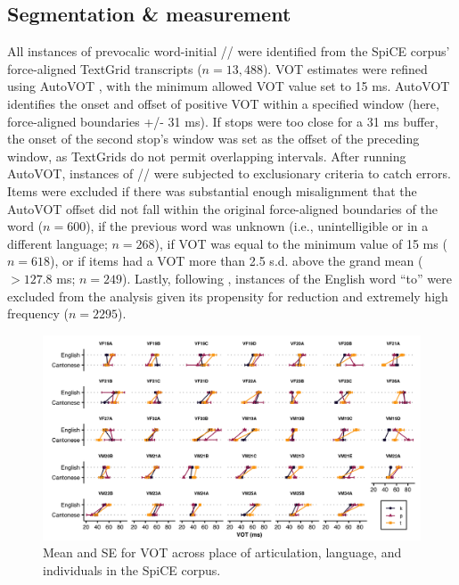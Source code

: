 \subsection{Segmentation \& measurement}
All instances of prevocalic word-initial // were identified from the SpiCE corpus' force-aligned TextGrid transcripts ($n=13,488$). VOT estimates were refined using AutoVOT \citep{keshet_2014_autovot}, with the minimum allowed VOT value set to 15 ms. AutoVOT identifies the onset and offset of positive VOT within a specified window (here, force-aligned boundaries +/- 31 ms). If stops were too close for a 31 ms buffer, the onset of the second stop's window was set as the offset of the preceding window, as TextGrids do not permit overlapping intervals. After running AutoVOT, instances of // were subjected to exclusionary criteria to catch errors. Items were excluded if there was substantial enough misalignment that the AutoVOT offset did not fall within the original force-aligned boundaries of the word ($n=600$), if the previous word was unknown (i.e., unintelligible or in a different language; $n=268$), if VOT was equal to the minimum value of 15 ms ($n=618$),  or if items had a VOT more than 2.5 s.d. above the grand mean ($>127.8$ ms; $n=249$). Lastly, following \citep{chodroff_2017_structure}, instances of the English word ``to'' were excluded from the analysis given its propensity for reduction and extremely high frequency ($n=2295$). 

\begin{figure}[hbtp]
  \centering
  \includegraphics[width=\linewidth]{figures/4-ptk_vot_individuals.png}
  \caption{Mean and SE for VOT across place of articulation, language, and individuals in the SpiCE corpus.}
  \label{fig:ids}
\end{figure}

